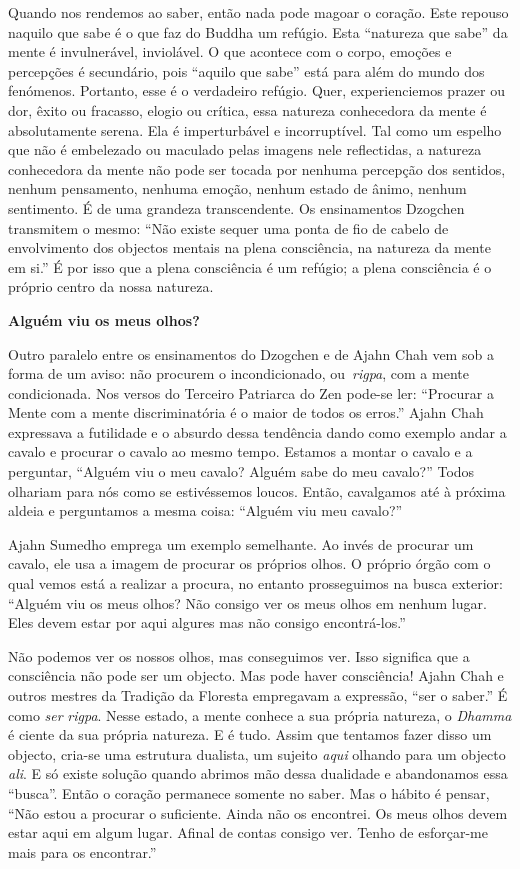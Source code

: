 Quando nos rendemos ao saber, então nada pode magoar o coração. Este
repouso naquilo que sabe é o que faz do Buddha um refúgio. Esta
``natureza que sabe'' da mente é invulnerável, inviolável. O que
acontece com o corpo, emoções e percepções é secundário, pois ``aquilo
que sabe'' está para além do mundo dos fenómenos. Portanto, esse é o
verdadeiro refúgio. Quer, experienciemos prazer ou dor, êxito ou
fracasso, elogio ou crítica, essa natureza conhecedora da mente é
absolutamente serena. Ela é imperturbável e incorruptível. Tal como um
espelho que não é embelezado ou maculado pelas imagens nele reflectidas,
a natureza conhecedora da mente não pode ser tocada por nenhuma
percepção dos sentidos, nenhum pensamento, nenhuma emoção, nenhum estado
de ânimo, nenhum sentimento. É de uma grandeza transcendente. Os
ensinamentos Dzogchen transmitem o mesmo: ``Não existe sequer uma ponta
de fio de cabelo de envolvimento dos objectos mentais na plena
consciência, na natureza da mente em si.'' É por isso que a plena
consciência é um refúgio; a plena consciência é o próprio centro da
nossa natureza.

\textbf{Alguém viu os meus olhos?}

Outro paralelo entre os ensinamentos do Dzogchen e de Ajahn Chah vem sob
a forma de um aviso: não procurem o incondicionado, ou~\emph{rigpa}, com
a mente condicionada. Nos versos do Terceiro Patriarca do Zen pode-se
ler: ``Procurar a Mente com a mente discriminatória é o maior de todos
os erros.'' Ajahn Chah expressava a futilidade e o absurdo dessa
tendência dando como exemplo andar a cavalo e procurar o cavalo ao mesmo
tempo. Estamos a montar o cavalo e a perguntar, ``Alguém viu o meu
cavalo? Alguém sabe do meu cavalo?'' Todos olhariam para nós como se
estivéssemos loucos. Então, cavalgamos até à próxima aldeia e
perguntamos a mesma coisa: ``Alguém viu meu cavalo?''

Ajahn Sumedho emprega um exemplo semelhante. Ao invés de procurar um
cavalo, ele usa a imagem de procurar os próprios olhos. O próprio órgão
com o qual vemos está a realizar a procura, no entanto prosseguimos na
busca exterior: ``Alguém viu os meus olhos? Não consigo ver os meus
olhos em nenhum lugar. Eles devem estar por aqui algures mas não consigo
encontrá-los.''

Não podemos ver os nossos olhos, mas conseguimos ver. Isso significa que
a consciência não pode ser um objecto. Mas pode haver consciência! Ajahn
Chah e outros mestres da Tradição da Floresta empregavam a expressão,
``ser o saber.'' É como \emph{ser} \emph{rigpa}. Nesse estado, a mente
conhece a sua própria natureza, o \emph{Dhamma} é ciente da sua própria
natureza. E é tudo. Assim que tentamos fazer disso um objecto, cria-se
uma estrutura dualista, um sujeito \emph{aqui} olhando para um objecto
\emph{ali}. E só existe solução quando abrimos mão dessa dualidade e
abandonamos essa ``busca''. Então o coração permanece somente no saber.
Mas o hábito é pensar, ``Não estou a procurar o suficiente. Ainda não os
encontrei. Os meus olhos devem estar aqui em algum lugar. Afinal de
contas consigo ver. Tenho de esforçar-me mais para os encontrar.''

